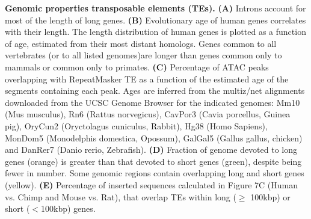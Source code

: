 \textbf{Genomic properties transposable elements (TEs).} 
\textbf{(A)} Introns account for most of the length of long genes. 
\textbf{(B)} Evolutionary age of human genes correlates with their length. The length distribution of human genes is plotted as a function of age, estimated from their most distant homologs. Genes common to all vertebrates (or to all listed genomes)are longer than genes common only to mammals or common only to primates.
\textbf{(C)} Percentage of ATAC peaks  overlapping with RepeatMasker TE as a function of the estimated age of the segments containing each peak. Ages are inferred from the multiz/net alignments downloaded from the UCSC Genome Browser for the indicated genomes: Mm10 (Mus musculus), Rn6 (Rattus norvegicus), CavPor3 (Cavia porcellus, Guinea pig), OryCun2 (Oryctolagus cuniculus, Rabbit), Hg38 (Homo Sapiens), MonDom5 (Monodelphis domestica, Opossum), GalGal5 (Gallus gallus, chicken) and DanRer7 (Danio rerio, Zebrafish). 
\textbf{(D)} Fraction of genome devoted to long genes (orange) is greater than that devoted to short genes (green), despite being fewer in number. Some genomic regions contain overlapping long and short genes (yellow).
\textbf{(E)} Percentage of inserted sequences calculated in Figure 7C (Human vs. Chimp and Mouse vs. Rat), that overlap TEs within long ($\geq$ 100kbp) or short ($<$100kbp) genes. 